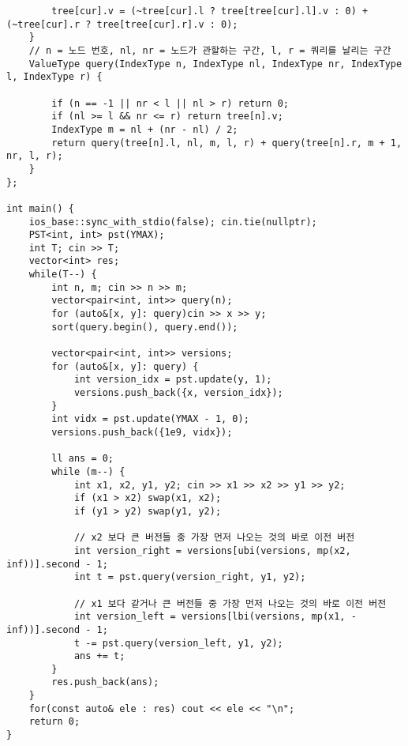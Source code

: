 \documentclass[landscape, 8pt, a4paper, oneside, twocolumn]{extarticle}
\begin{document}
\begin{verbatim}
        tree[cur].v = (~tree[cur].l ? tree[tree[cur].l].v : 0) + (~tree[cur].r ? tree[tree[cur].r].v : 0);
    }
    // n = 노드 번호, nl, nr = 노드가 관할하는 구간, l, r = 쿼리를 날리는 구간
    ValueType query(IndexType n, IndexType nl, IndexType nr, IndexType l, IndexType r) {

        if (n == -1 || nr < l || nl > r) return 0;
        if (nl >= l && nr <= r) return tree[n].v;
        IndexType m = nl + (nr - nl) / 2;
        return query(tree[n].l, nl, m, l, r) + query(tree[n].r, m + 1, nr, l, r);
    }
};

int main() {
    ios_base::sync_with_stdio(false); cin.tie(nullptr);
	PST<int, int> pst(YMAX);
	int T; cin >> T;
	vector<int> res;
	while(T--) {
		int n, m; cin >> n >> m;
		vector<pair<int, int>> query(n);
		for (auto&[x, y]: query)cin >> x >> y;
		sort(query.begin(), query.end());

		vector<pair<int, int>> versions;
		for (auto&[x, y]: query) {
			int version_idx = pst.update(y, 1);
			versions.push_back({x, version_idx});
		}
		int vidx = pst.update(YMAX - 1, 0);
		versions.push_back({1e9, vidx});

		ll ans = 0;
		while (m--) {
			int x1, x2, y1, y2; cin >> x1 >> x2 >> y1 >> y2;
			if (x1 > x2) swap(x1, x2);
			if (y1 > y2) swap(y1, y2);

			// x2 보다 큰 버전들 중 가장 먼저 나오는 것의 바로 이전 버전
			int version_right = versions[ubi(versions, mp(x2, inf))].second - 1;
			int t = pst.query(version_right, y1, y2);

			// x1 보다 같거나 큰 버전들 중 가장 먼저 나오는 것의 바로 이전 버전
			int version_left = versions[lbi(versions, mp(x1, -inf))].second - 1;
			t -= pst.query(version_left, y1, y2);
			ans += t;
		}
		res.push_back(ans);
	}
	for(const auto& ele : res) cout << ele << "\n";
	return 0;
}
    \end{verbatim}
\end{document}
